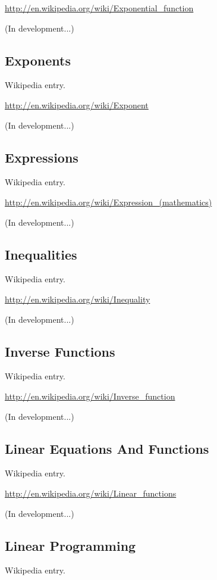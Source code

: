 \documentclass[12pt,twoside]{book}
\begin{document}
\href{http://en.wikipedia.org/wiki/Exponential_function}{http://en.wikipedia.org/wiki/Exponential\_function}

(In development...)

\subsection[Exponents]{Exponents}
Wikipedia entry.

\href{http://en.wikipedia.org/wiki/Exponent}{http://en.wikipedia.org/wiki/Exponent}

(In development...)

\subsection[Expressions]{Expressions}
Wikipedia entry.

\href{http://en.wikipedia.org/wiki/Expression_(mathematics)}{http://en.wikipedia.org/wiki/Expression\_(mathematics)}

(In development...)

\subsection[Inequalities]{Inequalities}
Wikipedia entry.

\href{http://en.wikipedia.org/wiki/Inequality}{http://en.wikipedia.org/wiki/Inequality}

(In development...)

\subsection[Inverse Functions]{Inverse Functions}
Wikipedia entry.

\href{http://en.wikipedia.org/wiki/Inverse_function}{http://en.wikipedia.org/wiki/Inverse\_function}

(In development...)

\subsection[Linear Equations And Functions]{Linear
Equations And Functions}
Wikipedia entry.

\href{http://en.wikipedia.org/wiki/Linear_functions}{http://en.wikipedia.org/wiki/Linear\_functions}

(In development...)

\subsection[Linear Programming]{Linear Programming}
Wikipedia entry.
\end{document}
